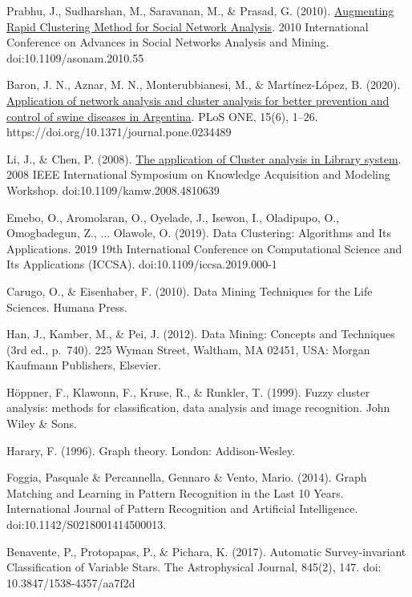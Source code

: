 \documentclass[10pt, a4paper]{article}
\begin{document}
\begin{thebibliography}{X}
 Prabhu, J., Sudharshan, M., Saravanan, M., \& Prasad, G. (2010). \href{https://ieeexplore.ieee.org/document/5563072} {Augmenting Rapid Clustering Method for Social Network Analysis}. 2010 International Conference on Advances in Social Networks Analysis and Mining. doi:10.1109/asonam.2010.55

 Baron, J. N., Aznar, M. N., Monterubbianesi, M., \& Martínez-López, B. (2020). \href{https://search.ebscohost.com/login.aspx?direct=true&db=aph&AN=143827917&lang=es&site=ehost-live&scope=site} {Application of network analysis and cluster analysis for better prevention and control of swine diseases in Argentina}. PLoS ONE, 15(6), 1–26. https://doi.org/10.1371/journal.pone.0234489

 Li, J., \& Chen, P. (2008). \href{https://ieeexplore.ieee.org/document/4810639} {The application of Cluster analysis in Library system}. 2008 IEEE International Symposium on Knowledge Acquisition and Modeling Workshop. doi:10.1109/kamw.2008.4810639

 Emebo, O., Aromolaran, O., Oyelade, J., Isewon, I., Oladipupo, O., Omogbadegun, Z., ... Olawole, O. (2019). Data Clustering: Algorithms and Its Applications. 2019 19th International Conference on Computational Science and Its Applications (ICCSA). doi:10.1109/iccsa.2019.000-1

 Carugo, O., \& Eisenhaber, F. (2010). Data Mining Techniques for the Life Sciences. Humana Press.

Han, J., Kamber, M., \& Pei, J. (2012). Data Mining: Concepts and Techniques (3rd ed., p.~740). 225 Wyman Street, Waltham, MA 02451, USA: Morgan Kaufmann Publishers, Elsevier.

 Höppner, F., Klawonn, F., Kruse, R., \& Runkler, T. (1999). Fuzzy cluster analysis: methods for classification, data analysis and image recognition. John Wiley \& Sons.

 Harary, F. (1996). Graph theory. London: Addison-Wesley.

 Foggia, Pasquale \& Percannella, Gennaro \& Vento, Mario. (2014). Graph Matching and Learning in Pattern Recognition in the Last 10 Years. International Journal of Pattern Recognition and Artificial Intelligence. doi:10.1142/S0218001414500013. 

 Benavente, P., Protopapas, P., \& Pichara, K. (2017). Automatic Survey-invariant Classification of Variable Stars. The Astrophysical Journal, 845(2), 147. doi: 10.3847/1538-4357/aa7f2d


\end{thebibliography}
\end{document}
